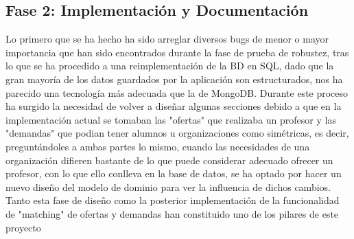 \documentclass{article}
\begin{document}
\subsection{Fase 2: Implementación y Documentación}
Lo primero que se ha hecho ha sido arreglar diversos bugs de menor o mayor importancia que han sido encontrados durante la fase de prueba de robustez, tras lo que se ha procedido a una reimplementación de la BD en SQL, dado que la gran mayoría de los datos guardados por la aplicación son estructurados, nos ha parecido una tecnología más adecuada que la de MongoDB.
Durante este proceso ha surgido la necesidad de volver a diseñar algunas secciones debido a que en la implementación actual se tomaban las "ofertas" que realizaba un profesor y las "demandas" que podian tener alumnos u organizaciones como simétricas, es decir, preguntándoles a ambas partes lo mismo, cuando las necesidades de una organización difieren bastante de lo que puede considerar adecuado ofrecer un profesor, con lo que ello conlleva en la base de datos, se ha optado por hacer un nuevo diseño del modelo de dominio para ver la influencia de dichos cambios.
Tanto esta fase de diseño como la posterior implementación de la funcionalidad de "matching" de ofertas y demandas han constituido uno de los pilares de este proyecto


\end{document}
